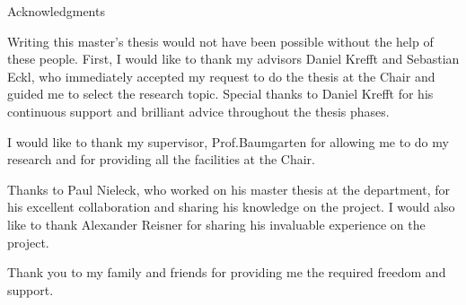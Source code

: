 \thispagestyle{empty}

\vspace*{20mm}

\begin{center}
{ Acknowledgments}
\end{center}

\vspace{10mm}


Writing this master's thesis would not have been possible without the help of these people. 
First, I would like to thank my advisors Daniel Krefft and Sebastian Eckl, who immediately accepted my request to do the thesis at the Chair and guided me to select the research topic. Special thanks to Daniel Krefft for his continuous support and brilliant advice throughout the thesis phases.


I would like to thank my supervisor, Prof.Baumgarten for allowing me to do my research and for providing all the facilities at the Chair. 

Thanks to Paul Nieleck, who worked on his master thesis at the department, for his excellent collaboration and sharing his knowledge on the project. I would also like to thank Alexander Reisner for sharing his invaluable experience on the project. 

Thank you to my family and friends for providing me the required freedom and support.

\cleardoublepage{}
